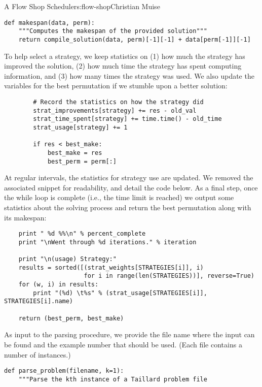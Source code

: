 \begin{aosachapter}{A Flow Shop Scheduler}{s:flow-shop}{Christian Muise}
\begin{verbatim}
def makespan(data, perm):
    """Computes the makespan of the provided solution"""
    return compile_solution(data, perm)[-1][-1] + data[perm[-1]][-1]
\end{verbatim}

To help select a strategy, we keep statistics on (1) how much the
strategy has improved the solution, (2) how much time the strategy has
spent computing information, and (3) how many times the strategy was
used. We also update the variables for the best permutation if we
stumble upon a better solution:

\begin{verbatim}
        # Record the statistics on how the strategy did
        strat_improvements[strategy] += res - old_val
        strat_time_spent[strategy] += time.time() - old_time
        strat_usage[strategy] += 1

        if res < best_make:
            best_make = res
            best_perm = perm[:]
\end{verbatim}

At regular intervals, the statistics for strategy use are updated. We
removed the associated snippet for readability, and detail the code
below. As a final step, once the while loop is complete (i.e., the time
limit is reached) we output some statistics about the solving process
and return the best permutation along with its makespan:

\begin{verbatim}
    print " %d %%\n" % percent_complete
    print "\nWent through %d iterations." % iteration

    print "\n(usage) Strategy:"
    results = sorted([(strat_weights[STRATEGIES[i]], i)
                      for i in range(len(STRATEGIES))], reverse=True)
    for (w, i) in results:
        print "(%d) \t%s" % (strat_usage[STRATEGIES[i]], STRATEGIES[i].name)

    return (best_perm, best_make)
\end{verbatim}

\label{parsing-problems}

As input to the parsing procedure, we provide the file name where the
input can be found and the example number that should be used. (Each
file contains a number of instances.)

\begin{verbatim}
def parse_problem(filename, k=1):
    """Parse the kth instance of a Taillard problem file


\end{verbatim}
\end{aosachapter}
